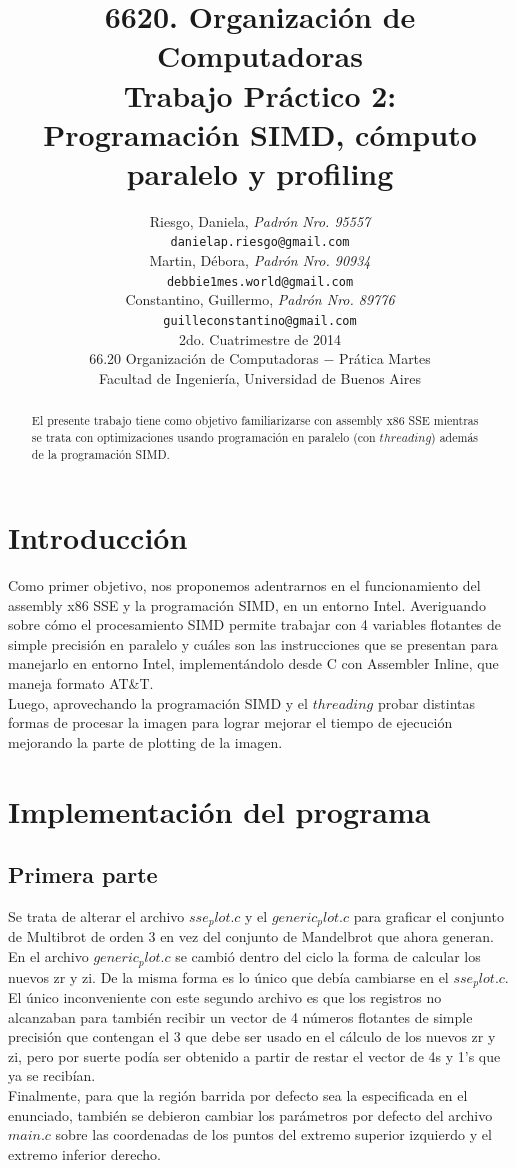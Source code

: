 \documentclass[a4paper,10pt]{article}
\title{ \textbf{ 6620. Organizaci\'on de Computadoras\\
Trabajo Pr\'actico 2: \\
Programación SIMD, cómputo paralelo y profiling}}
\author{ Riesgo, Daniela, \textit{Padr\'on Nro. 95557} \\
\texttt{ danielap.riesgo@gmail.com } \\[2.5ex]
Martin, D\'ebora, \textit{Padr\'on Nro. 90934} \\
\texttt{ debbie1mes.world@gmail.com } \\[2.5ex]
Constantino, Guillermo, \textit{Padr\'on Nro. 89776} \\
\texttt{ guilleconstantino@gmail.com } \\[2.5ex]
\normalsize{2do. Cuatrimestre de 2014} \\
\normalsize{66.20 Organizaci\'on de Computadoras $-$ Pr\'atica Martes} \\
\normalsize{Facultad de Ingenier\'ia, Universidad de Buenos Aires} \\
}
\date{}
\begin{document}
\maketitle
\thispagestyle{empty} %

\newpage
\tableofcontents
\newpage


\begin{abstract}
El presente trabajo tiene como objetivo familiarizarse con assembly x86 SSE mientras se trata con optimizaciones usando programación en paralelo (con $threading$) además de la programación SIMD.

\end{abstract}




\setcounter{page}{2}
\section{Introducci\'on}
Como primer objetivo, nos proponemos adentrarnos en el funcionamiento del assembly x86 SSE y la programación SIMD, en un entorno Intel. Averiguando sobre cómo el procesamiento SIMD permite trabajar con 4 variables flotantes de simple precisión en paralelo y cuáles son las instrucciones que se presentan para manejarlo en entorno Intel, implementándolo desde C con Assembler Inline, que maneja formato AT&T.\\
Luego, aprovechando la programación SIMD y el $threading$ probar distintas formas de procesar la imagen para lograr mejorar el tiempo de ejecución mejorando la parte de plotting de la imagen.




\section{Implementación del programa}

\subsection{Primera parte}
Se trata de alterar el archivo $sse_plot.c$ y el $generic_plot.c$ para graficar el conjunto de Multibrot de orden 3 en vez del conjunto de Mandelbrot que ahora generan.\\
En el archivo $generic_plot.c$ se cambió dentro del ciclo la forma de calcular los nuevos zr y zi. De la misma forma es lo único que debía cambiarse en el $sse_plot.c$. El único inconveniente con este segundo archivo es que los registros no alcanzaban para también recibir un vector de 4 números flotantes de simple precisión que contengan el 3 que debe ser usado en el cálculo de los nuevos zr y zi, pero por suerte podía ser obtenido a partir de restar el vector de 4s y 1's que ya se recibían.\\
Finalmente, para que la región barrida por defecto sea la especificada en el enunciado, también se debieron cambiar los parámetros por defecto del archivo $main.c$ sobre las coordenadas de los puntos del extremo superior izquierdo y el extremo inferior derecho.
\end{document}
